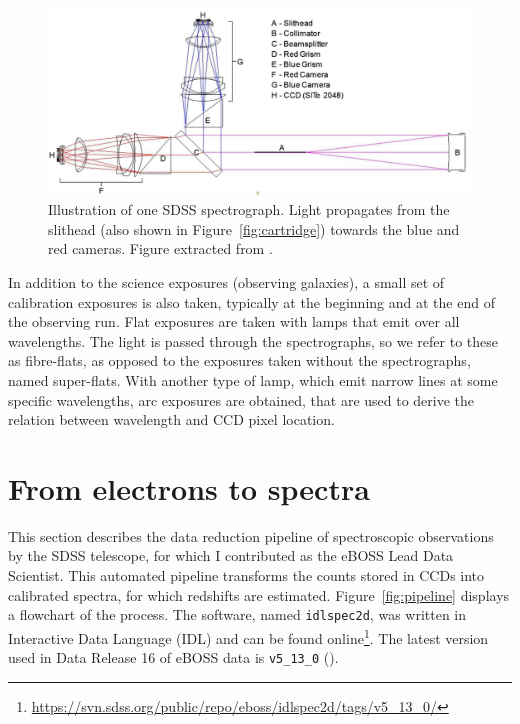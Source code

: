 \begin{figure}[t]
    \centering 
    \includegraphics[width=\textwidth]{fig/spectro/spectrograph.png}
    \caption{Illustration of one SDSS spectrograph. 
    Light propagates from the slithead (also shown in Figure~\ref{fig:cartridge})
    towards the blue and red cameras. 
    Figure extracted from \cite{smeeMultiobjectFiberfedSpectrographs2013}. }
    \label{fig:spectrograph}
\end{figure}
 

In addition to the science exposures (observing galaxies), a small set
of calibration exposures is also taken, typically at the beginning and at the end 
of the observing run. Flat exposures are taken with lamps that emit over all 
wavelengths. The light is passed through the spectrographs, so we refer to these
as fibre-flats, as opposed to the exposures taken without the spectrographs, named 
super-flats. With another type of lamp, which emit narrow lines at some specific 
wavelengths, arc exposures are obtained, that are used to derive the relation between 
wavelength and CCD pixel location.

\section{From electrons to spectra}
\label{spectro:pipeline2d}

This section describes the data reduction pipeline of 
spectroscopic observations by the SDSS telescope, for which 
I contributed as the eBOSS Lead Data Scientist. 
This automated pipeline transforms the counts stored in CCDs into 
calibrated spectra, for which redshifts are estimated. 
Figure~\ref{fig:pipeline} displays a flowchart of the process. 
The software, named \texttt{idlspec2d}, was written in Interactive Data Language (IDL)
and can be found online\footnote{\url{https://svn.sdss.org/public/repo/eboss/idlspec2d/tags/v5_13_0/}}.
The latest version used in Data Release 16 
of eBOSS data is \texttt{v5\_13\_0} (\cite{ahumada16thDataRelease2020}).


